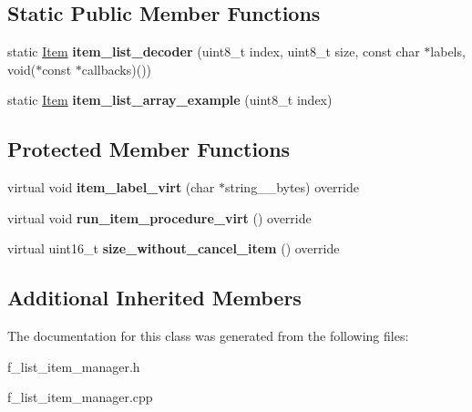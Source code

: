 \subsection*{Static Public Member Functions}
\begin{DoxyCompactItemize}
\item 
\mbox{\label{classui_1_1_list_item_manager_a82b34a4c000daa9b5289e81cd745ca62}} 
static \mbox{\hyperlink{structui_1_1_list_item_manager_1_1_item}{Item}} {\bfseries item\+\_\+list\+\_\+decoder} (uint8\+\_\+t index, uint8\+\_\+t size, const char $\ast$labels, void($\ast$const $\ast$callbacks)())
\item 
\mbox{\label{classui_1_1_list_item_manager_afedb99335d7835a995234cac28dfcfb9}} 
static \mbox{\hyperlink{structui_1_1_list_item_manager_1_1_item}{Item}} {\bfseries item\+\_\+list\+\_\+array\+\_\+example} (uint8\+\_\+t index)
\end{DoxyCompactItemize}
\subsection*{Protected Member Functions}
\begin{DoxyCompactItemize}
\item 
\mbox{\label{classui_1_1_list_item_manager_acc3e92ee968d3d46c3421b7762daba22}} 
virtual void {\bfseries item\+\_\+label\+\_\+virt} (char $\ast$string\+\_\+\_\+bytes) override
\item 
\mbox{\label{classui_1_1_list_item_manager_a059571216c70ca61e954c92de3f82f18}} 
virtual void {\bfseries run\+\_\+item\+\_\+procedure\+\_\+virt} () override
\item 
\mbox{\label{classui_1_1_list_item_manager_affb65d5c8c29afd1a26789ac8b3a6855}} 
virtual uint16\+\_\+t {\bfseries size\+\_\+without\+\_\+cancel\+\_\+item} () override
\end{DoxyCompactItemize}
\subsection*{Additional Inherited Members}


The documentation for this class was generated from the following files\+:\begin{DoxyCompactItemize}
\item 
f\+\_\+list\+\_\+item\+\_\+manager.\+h\item 
f\+\_\+list\+\_\+item\+\_\+manager.\+cpp\end{DoxyCompactItemize}
